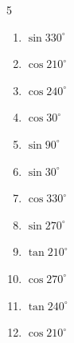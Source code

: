 \begin{multicols}{5}
\begin{enumerate}
        \phantom{$\displaystyle =-1$}

  \item $\displaystyle \sin{330^\circ}$


\columnbreak %

\resetques

  \item $\displaystyle \cos{210^\circ}$


  \item $\displaystyle \cos{240^\circ}$


  \item $\displaystyle \cos{30^\circ}$


  \item $\displaystyle \sin{90^\circ}$

        \phantom{$\displaystyle =1$}

  \item $\displaystyle \sin{30^\circ}$


  \item $\displaystyle \cos{330^\circ}$


  \item $\displaystyle \sin{270^\circ}$

        \phantom{$\displaystyle =-1$}

  \item $\displaystyle \tan{210^\circ}$


  \item $\displaystyle \cos{270^\circ}$

        \phantom{$\displaystyle =0$}

  \item $\displaystyle \tan{240^\circ}$


  \item $\displaystyle \cos{210^\circ}$


\end{enumerate}
\end{multicols}
